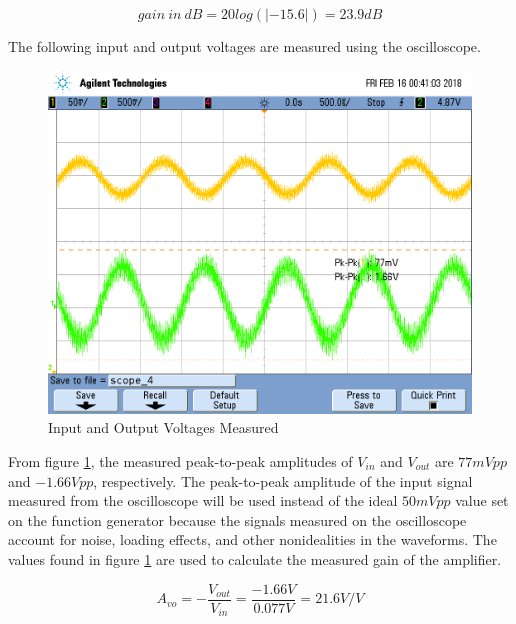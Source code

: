 \begin{equation}
	\label{eq:theoretical_gain_db}
        gain \ in \ dB = 20 log(|-15.6|) = 23.9 dB
\end{equation}

\FloatBarrier

The following input and output voltages are measured using the oscilloscope.

\FloatBarrier

\begin{figure}[h!]
	\centering
		\includegraphics[scale=0.35]{./images/scope_4.png}
		\caption{Input and Output Voltages Measured}
		\label{fig:measured_vin_vout}
\end{figure}

\FloatBarrier

From figure \ref{fig:measured_vin_vout}, the measured peak-to-peak amplitudes of $V_{in}$ and $V_{out}$ are $77 mVpp$ and $-1.66 Vpp$, respectively.
The peak-to-peak amplitude of the input signal measured from the oscilloscope will be used instead of the ideal $50 mVpp$ value set on the function generator because the signals measured on the oscilloscope account for noise, loading effects, and other nonidealities in the waveforms.
The values found in figure \ref{fig:measured_vin_vout} are used to calculate the measured gain of the amplifier.

\FloatBarrier

\begin{equation}
	\label{eq:measured_gain}
	A_{vo} = - \frac{V_{out}}{V_{in}} = \frac{-1.66 V}{0.077 V} = 21.6 V/V
\end{equation}

